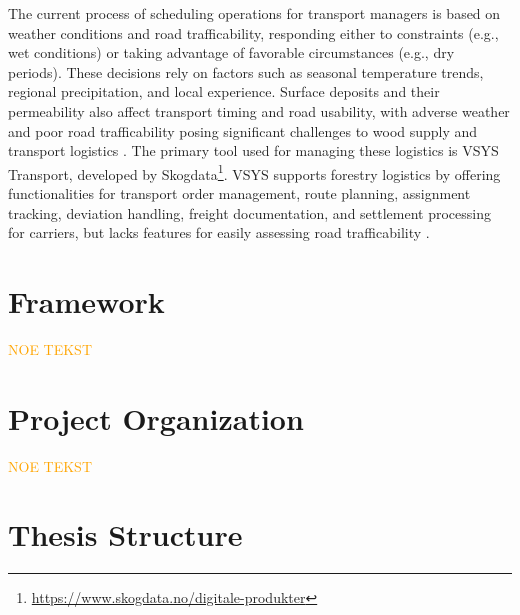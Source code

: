 The current process of scheduling operations for transport managers is based on weather conditions and road \gls{trafficability}, responding either to constraints (e.g., wet conditions) or taking advantage of favorable circumstances (e.g., dry periods). These decisions rely on factors such as seasonal temperature trends, regional precipitation, and local experience. Surface deposits and their \gls{permeability} also affect transport timing and road usability, with adverse weather and poor road \gls{trafficability} posing significant challenges to wood supply and transport logistics \cite[p.~2]{fjeld2023trafficability}. The primary tool used for managing these logistics is VSYS Transport, developed by Skogdata\footnote{\url{https://www.skogdata.no/digitale-produkter}}. VSYS supports forestry logistics by offering functionalities for transport order management, route planning, assignment tracking, deviation handling, freight documentation, and settlement processing for carriers, but lacks features for easily assessing road trafficability \cite{skogdata2024vsys}.

\section{Framework}

\textcolor{orange}{NOE TEKST}

\section{Project Organization}

\textcolor{orange}{NOE TEKST}

\section{Thesis Structure}

